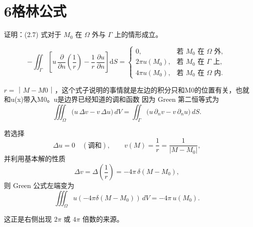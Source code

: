 \section{6格林公式}
\begin{homework}[1]
证明：(2.7) 式对于 $M_0$ 在 $\Omega$ 外与 $\Gamma$ 上的情形成立。
\end{homework}
\begin{equation}\tag{2.7}\label{eq:2.7}
 - \iint_{\Gamma}
 \left[
   u\,\frac{\partial}{\partial n}\!\left(\frac{1}{r}\right)
   - \frac{1}{r}\,\frac{\partial u}{\partial n}
 \right]\mathrm{d}S
 =
 \begin{cases}
   0, & \text{若 } M_0 \text{ 在 } \Omega \text{ 外},\\[4pt]
   2\pi u(M_0), & \text{若 } M_0 \text{ 在 } \Gamma \text{ 上},\\[4pt]
   4\pi u(M_0), & \text{若 } M_0 \text{ 在 } \Omega \text{ 内}.
 \end{cases}
\end{equation}
\begin{dxtips}
    $r=｜M-M0｜$，这个式子说明的事情就是左边的积分只和M0的位置有关，也就和u(x)带入M0。u是边界已经知道的调和函数
    因为 Green 第二恒等式为
\[
\iiint_{\Omega} \bigl(u\,\Delta v - v\,\Delta u\bigr)\,dV
=
\iint_{\Gamma} \bigl(u\,\partial_n v - v\,\partial_n u\bigr)\,dS .
\]

若选择
\[
\Delta u = 0 \quad (\text{调和}),
\qquad
v(M)=\frac{1}{r}=\frac{1}{|M-M_0|},
\]
并利用基本解的性质
\[
\Delta v = \Delta\!\left(\frac{1}{r}\right)
= -4\pi\,\delta(M-M_0),
\]
则 Green 公式左端变为
\[
\iiint_{\Omega} u(-4\pi\delta(M-M_0))\,dV
= -4\pi\,u(M_0).
\]

这正是右侧出现 $2\pi$ 或 $4\pi$ 倍数的来源。
\end{dxtips}
